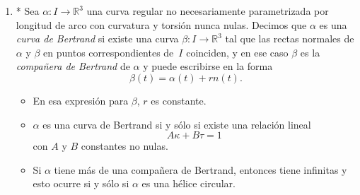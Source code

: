 \documentclass[11pt]{article}
\newcommand{\R}{{\mathbb{R}}}
\begin{document}
\begin{enumerate}
	
	\item* Sea $\alpha:I\to\R^3$ una curva regular no necesariamente parametrizada por
	longitud de arco con curvatura y torsi\'on nunca nulas. Decimos que $\alpha$ es una
	\emph{curva de Bertrand} si existe una curva $\beta: I \to \R^3$ tal que las rectas
	normales de $\alpha$ y $\beta$ en puntos correspondientes de~$I$ coinciden, y en ese
	caso $\beta$ es la \emph{compa\~nera de Bertrand} de $\alpha$ y puede escribirse en la
	forma
	\[
	\beta(t)=\alpha(t)+rn(t).
	\]
	\begin{itemize}
		
		\item En esa expresi\'on para $\beta$, $r$ es constante.
		
		\item $\alpha$ es una curva de Bertrand si y s\'olo si existe una relaci\'on lineal
		\[
		A\kappa+B\tau=1
		\]
		con $A$ y $B$ constantes no nulas.
		
		\item Si $\alpha$ tiene m\'as de una compa\~nera de Bertrand, entonces
		tiene infinitas y esto ocurre si y s\'olo si $\alpha$ es una h\'elice
		circular.
		
	\end{itemize}
	
	
\end{enumerate}
\end{document}
